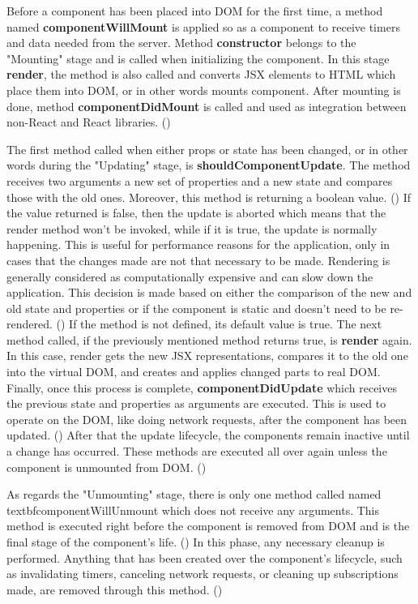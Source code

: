 Before a component has been placed into DOM for the first time, a method named \textbf{componentWillMount} is applied so as a component to receive timers and data needed from the server. Method \textbf{constructor}  belongs to the "Mounting" stage and is called when initializing the component. In this stage \textbf{render}, the method is also called and converts JSX elements to HTML which place them into DOM, or in other words mounts component. After mounting is done, method \textbf{componentDidMount} is called and used as integration between non-React and React libraries. (\cite{Reference13}) \par

The first method called when either props or state has been changed, or in other words during the "Updating" stage, is \textbf{shouldComponentUpdate}. The method receives two arguments a new set of properties and a new state and compares those with the old ones. Moreover, this method is returning a boolean value. (\cite{Reference13}) If the value returned is false, then the update is aborted which means that the render method won't be invoked, while if it is true, the update is normally happening. This is useful for performance reasons for the application, only in cases that the changes made are not that necessary to be made. Rendering is generally considered as computationally expensive and can slow down the application. This decision is made based on either the comparison of the new and old state and properties or if the component is static and doesn't need to be re-rendered. (\cite{Reference14}) If the method is not defined, its default value is true. The next method called, if the previously mentioned method returns true, is \textbf{render} again. In this case, render gets the new JSX representations, compares it to the old one into the virtual DOM, and creates and applies changed parts to real DOM. Finally, once this process is complete, \textbf{componentDidUpdate} which receives the previous state and properties as arguments are executed. This is used to operate on the DOM, like doing network requests, after the component has been updated. (\cite{Reference16}) After that the update lifecycle, the components remain inactive until a change has occurred. These methods are executed all over again unless the component is unmounted from DOM. (\cite{Reference13}) \par 

As regards the "Unmounting" stage, there is only one method called named textbf{componentWillUnmount} which does not receive any arguments. This method is executed right before the component is removed from DOM and is the final stage of the component's life. (\cite{Reference14}) In this phase, any necessary cleanup is performed. Anything that has been created over the component's lifecycle, such as invalidating timers, canceling network requests, or cleaning up subscriptions made, are removed through this method. (\cite{Reference16}) \par 

